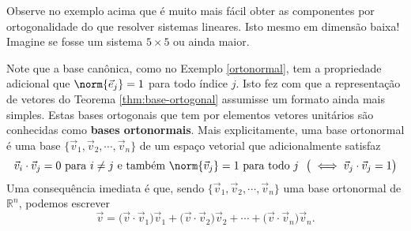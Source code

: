 Observe no exemplo acima que é muito mais fácil obter as componentes por ortogonalidade do que resolver sistemas lineares. Isto mesmo em dimensão baixa! Imagine se fosse um sistema $5\times 5$ ou ainda maior.


Note que a base canônica, como no Exemplo \ref{ortonormal}, tem a propriedade adicional que $\norm{\vec{e}_j} = 1$ para todo índice $j$. Isto fez com que a representação de vetores do Teorema \ref{thm:base-ortogonal} assumisse um formato ainda mais simples. Estas bases ortogonais que tem por elementos vetores unitários são conhecidas como \textbf{bases ortonormais}. Mais explicitamente, uma base ortonormal é uma base $\{\vec{v}_1, \vec{v}_2, \cdots, \vec{v}_n\}$ de um espaço vetorial que adicionalmente satisfaz
\begin{equation}
\vec{v}_i \cdot \vec{v}_j = 0 \text{ para } i \neq j \text{ e também } \norm{\vec{v}_j} = 1 \text{ para todo } j \ \ \big( \iff \vec{v}_j \cdot \vec{v}_j = 1 \big)
\end{equation} Uma consequência imediata é que, sendo $\{\vec{v}_1, \vec{v}_2, \cdots, \vec{v}_n\}$ uma base ortonormal de $\mathbb{R}^n$, podemos escrever
\begin{equation}
\vec{v} = \big( \vec{v} \cdot \vec{v}_1 \big) \vec{v}_1 + \big( \vec{v} \cdot \vec{v}_2 \big) \vec{v}_2  + \cdots + \big( \vec{v} \cdot \vec{v}_n \big) \vec{v}_n.
\end{equation}

